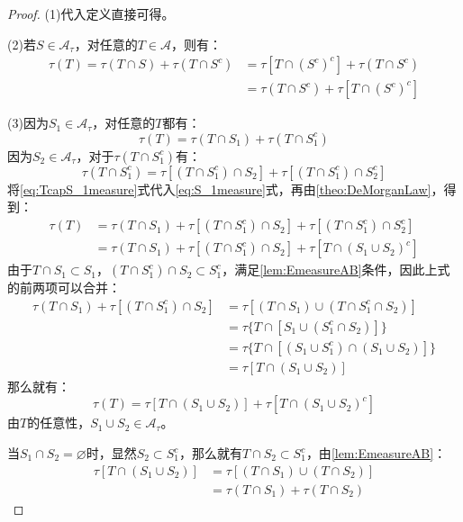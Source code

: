 \begin{proof}
	(1)代入定义直接可得。\par
	(2)若$S\in \mathscr{A}_{\tau}$，对任意的$T\in \mathscr{A}$，则有：
	\begin{align*}
		\tau(T)=\tau(T\cap S)+\tau(T\cap S^c)
		&=\tau[T\cap(S^c)^c]+\tau(T\cap S^c) \\
		&=\tau(T\cap S^c)+\tau[T\cap(S^c)^c]
	\end{align*}\par
	(3)因为$S_1\in \mathscr{A}_{\tau}$，对任意的$T$都有：
	\begin{equation}\label{eq:S_1measure}
		\tau(T)=\tau(T\cap S_1)+\tau(T\cap S_1^c)
	\end{equation}
	因为$S_2\in \mathscr{A}_{\tau}$，对于$\tau(T\cap S_1^c)$有：
	\begin{equation}\label{eq:TcapS_1measure}
		\tau(T\cap S_1^c)=\tau[(T\cap S_1^c)\cap S_2]+\tau[(T\cap S_1^c)\cap S_2^c]
	\end{equation}
	将\eqref{eq:TcapS_1measure}式代入\eqref{eq:S_1measure}式，再由\cref{theo:DeMorganLaw}，得到：
	\begin{align*}
		\tau(T)&=\tau(T\cap S_1)+\tau[(T\cap S_1^c)\cap S_2]+\tau[(T\cap S_1^c)\cap S_2^c] \\
		&=\tau(T\cap S_1)+\tau[(T\cap S_1^c)\cap S_2]+\tau[T\cap(S_1\cup S_2)^c]
	\end{align*}
	由于$T\cap S_1\subset S_1$，$(T\cap S_1^c)\cap S_2\subset S_1^c$，满足\cref{lem:EmeasureAB}条件，因此上式的前两项可以合并：
	\begin{align*}
		\tau(T\cap S_1)+\tau[(T\cap S_1^c)\cap S_2]&=\tau[(T\cap S_1)\cup(T\cap S_1^c\cap S_2)] \\
		&=\tau\{T\cap[S_1\cup(S_1^c\cap S_2)]\} \\
		&=\tau\{T\cap[(S_1\cup S_1^c)\cap(S_1\cup S_2)]\} \\
		&=\tau[T\cap(S_1\cup S_2)]
	\end{align*}
	那么就有：
	\begin{equation*}
		\tau(T)=\tau[T\cap(S_1\cup S_2)]+\tau[T\cap(S_1\cup S_2)^c]
	\end{equation*}
	由$T$的任意性，$S_1\cup S_2\in \mathscr{A}_{\tau}$。\par
	当$S_1\cap S_2=\varnothing$时，显然$S_2\subset S_1^c$，那么就有$T\cap S_2\subset S_1^c$，由\cref{lem:EmeasureAB}：
	\begin{align*}
		\tau[T\cap(S_1\cup S_2)]&=\tau[(T\cap S_1)\cup(T\cap S_2)]\\
		&=\tau(T\cap S_1)+\tau(T\cap S_2)

\end{align*}
\end{proof}
